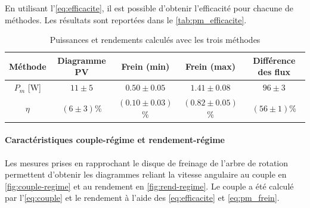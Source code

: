 En utilisant l'\autoref{eq:efficacite}, il est possible d'obtenir l'efficacité pour chacune de méthodes. Les résultats sont reportées dans le \autoref{tab:pm_efficacite}.

\begin{table}[h]
    \centering
    \begin{tabulary}{\linewidth}{C C C C C}
        \toprule
        Méthode & Diagramme PV & Frein (min) & Frein (max) & Différence des flux \\
        \midrule
        \(P_m\) [\si{\watt}] & \(11 \pm 5\) & \(0.50 \pm 0.05\) & \(1.41 \pm 0.08\) & \(96 \pm 3\) \\
        \(\eta\) & \((6 \pm 3)\)\% & \((0.10 \pm 0.03)\)\% & \((0.82 \pm 0.05)\)\% & \((56 \pm 1)\)\% \\
        \bottomrule
    \end{tabulary}
    \caption{Puissances et rendements calculés avec les trois méthodes}
    \label{tab:pm_efficacite}
\end{table}

\paragraph*{Caractéristiques couple-régime et rendement-régime}
Les mesures prises en rapprochant le disque de freinage de l'arbre de rotation permettent d'obtenir les diagrammes reliant la vitesse angulaire au couple en \autoref{fig:couple-regime} et au rendement en \autoref{fig:rend-regime}. Le couple a été calculé par l'\autoref{eq:couple} et le rendement à l'aide des \autoref{eq:efficacite} et \autoref{eq:pm_frein}.

